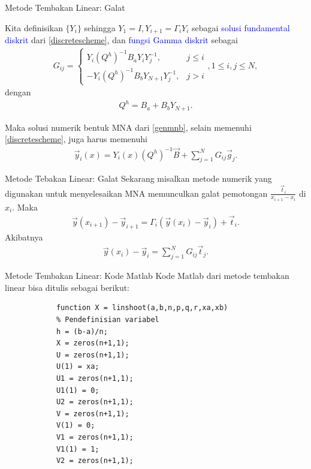 \documentclass[xcolor={dvipsnames}, 9pt]{beamer}
\renewcommand{\emph}[1]{\textcolor{Blue}{#1}}
\begin{document}
    \begin{frame}{Metode Tembakan Linear: Galat}
        \begin{definition}
        	Kita definisikan $\{Y_i\}$ sehingga $Y_1 = I, Y_{i+1} = \Gamma_iY_i$ sebagai \emph{solusi fundamental diskrit} dari \eqref{discretescheme}, dan \emph{fungsi Gamma diskrit} sebagai
        	\begin{align}\label{fgd}
        		G_{ij} = \begin{cases}
        			Y_i(Q^h)^{-1}B_aY_iY_j^{-1}, & j \leq i \\
        			-Y_i(Q^h)^{-1}B_bY_{N+1}Y_j^{-1}, & j > i
        		\end{cases},
        		1 \leq i, j \leq N,
        	\end{align}
        	dengan
        	\begin{align*}
        		Q^h = B_a + B_bY_{N+1}.
        	\end{align*}
        \end{definition}
        Maka solusi numerik bentuk MNA dari \eqref{genmnb}, selain memenuhi \eqref{discretescheme}, juga harus memenuhi
        \begin{align*}
        	\vec{y}_i(x) = Y_i(x)(Q^h)^{-1}\vec{B} + \sum_{j=1}^{N} G_{ij}\vec{g}_j.
        \end{align*}
    \end{frame}
    \begin{frame}{Metode Tebakan Linear: Galat}
    	Sekarang misalkan metode numerik yang digunakan untuk menyelesaikan MNA memunculkan galat pemotongan $\frac{\vec{t}_i}{x_{i+1}-x_i}$ di $x_i$. Maka
    	\begin{align*}
    		\vec{y}(x_{i+1}) - \vec{y}_{i+1} = \Gamma_i(\vec{y}(x_i)-\vec{y}_i) + \vec{t}_i.
    	\end{align*}
    	Akibatnya
    	\begin{align*}
    		\vec{y}(x_i) - \vec{y}_i = \sum_{j=1}^N G_{ij}\vec{t}_j.
    	\end{align*}
    \end{frame}
    \begin{frame}[fragile]{Metode Tembakan Linear: Kode Matlab}
    	Kode Matlab dari metode tembakan linear bisa ditulis sebagai berikut:
		\begin{verbatim}
			function X = linshoot(a,b,n,p,q,r,xa,xb)
			% Pendefinisian variabel
			h = (b-a)/n;
			X = zeros(n+1,1);
			U = zeros(n+1,1);
			U(1) = xa;
			U1 = zeros(n+1,1);
			U1(1) = 0;
			U2 = zeros(n+1,1);
			V = zeros(n+1,1);
			V(1) = 0;
			V1 = zeros(n+1,1);
			V1(1) = 1;
			V2 = zeros(n+1,1);
		\end{verbatim}
	\end{frame}
\end{document}
